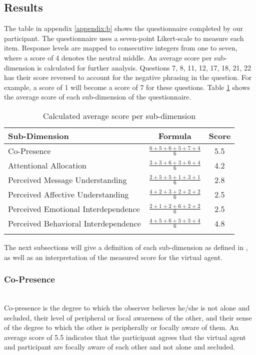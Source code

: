\subsection{Results}
The table in appendix \ref{appendix:b} shows the questionnaire completed by our participant. The questionnaire uses a seven-point Likert-scale to measure each item. Response levels are mapped to consecutive integers from one to seven, where a score of 4 denotes the neutral middle. An average score per sub-dimension is calculated for further analysis. Questions 7, 8, 11, 12, 17, 18, 21, 22 has their score reversed to account for the negative phrasing in the question. For example, a score of 1 will become a score of 7 for these questions.
Table \ref{tab:results} shows the average score of each sub-dimension of the questionnaire. 

\begin{table}[h]
\centering
\begin{tabular}{@{}lcc@{}}
\toprule
Sub-Dimension                        & Formula                           & Score \\ \midrule
Co-Presence                          & $\frac{6 + 5 + 6 + 5 + 7 + 4}{6}$ & 5.5    \\\addlinespace
Attentional Allocation               & $\frac{3 + 3 + 6 + 3 + 6 + 4}{6}$ & 4.2    \\\addlinespace
Perceived Message Understanding      & $\frac{2 + 5 + 5 + 1 + 3 + 1}{6}$ & 2.8    \\\addlinespace
Perceived Affective Understanding    & $\frac{4 + 2 + 3 + 2 + 2 + 2}{6}$ & 2.5    \\\addlinespace
Perceived Emotional Interdependence  & $\frac{2 + 1 + 2 + 6 + 2 + 2}{6}$ & 2.5    \\\addlinespace
Perceived Behavioral Interdependence & $\frac{4 + 5 + 6 + 5 + 5 + 4}{6}$ & 4.8   \\\addlinespace
\end{tabular}
\caption{Calculated average score per sub-dimension}
\label{tab:results}
\end{table}

The next subsections will give a definition of each sub-dimension as defined in \cite{Alcaiz2004InternalCA}, as well as an interpretation of the measured score for the virtual agent.

\subsubsection{Co-Presence}~\\ %
Co-presence is the degree to which the observer believes he/she is not alone and secluded, their level of peripheral or focal awareness of the other, and their sense of the degree to which the other is peripherally or focally aware of them. 
An average score of 5.5 indicates that the participant agrees that the virtual agent and participant are focally aware of each other and not alone and secluded.

